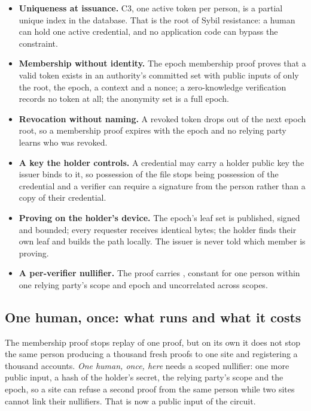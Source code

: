 \begin{itemize}
  \item \textbf{Uniqueness at issuance.} C3, one active token per person, is a partial unique index
    in the database. That is the root of Sybil resistance: a human can hold one active credential, and
    no application code can bypass the constraint. \sImpl
  \item \textbf{Membership without identity.} The epoch membership proof proves that a valid token
    exists in an authority's committed set with public inputs of only the root, the epoch, a context
    and a nonce; a zero-knowledge verification records no token at all; the anonymity set is a full
    epoch. \sImpl
  \item \textbf{Revocation without naming.} A revoked token drops out of the next epoch root, so a
    membership proof expires with the epoch and no relying party learns who was revoked. \sImpl
  \item \textbf{A key the holder controls.} A credential may carry a holder public key the issuer
    binds to it, so possession of the file stops being possession of the credential and a verifier
    can require a signature from the person rather than a copy of their credential. \sImpl
  \item \textbf{Proving on the holder's device.} The epoch's leaf set is published, signed and
    bounded; every requester receives identical bytes; the holder finds their own leaf and builds the
    path locally. The issuer is never told which member is proving. \sImpl
  \item \textbf{A per-verifier nullifier.} The proof carries
    , constant for one person within one relying
    party's scope and epoch and uncorrelated across scopes. \sImpl
\end{itemize}

\subsection{One human, once: what runs and what it costs}

The membership proof stops replay of one proof, but on its own it does not stop the same person
producing a thousand fresh proofs to one site and registering a thousand accounts. \emph{One human,
once, here} needs a scoped nullifier: one more public input, a hash of the holder's secret, the
relying party's scope and the epoch, so a site can refuse a second proof from the same person while
two sites cannot link their nullifiers. That is now a public input of the circuit. \sImpl


